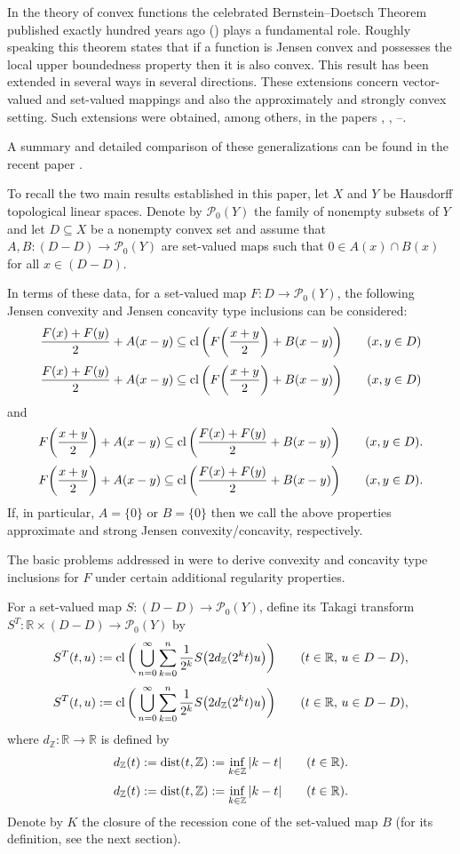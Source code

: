 \documentclass[12pt,reqno]{amsart}
\newcommand{\R}{\mathbb{R}}
\newcommand{\Z}{\mathbb{Z}}
\renewcommand{\P}{\mathscr{P}}
\newcommand{\dist}{\mathop{\hbox{\rm dist}}\nolimits}
\newcommand{\cl}{\mathop{\hbox{\rm cl}}\nolimits}
\theoremstyle{definition}
\def\Eq#1#2{\ifthenelse{\equal{#1}{*}}
  {\begin{equation*}\begin{aligned}[]#2\end{aligned}\end{equation*}}
  {\begin{equation}\begin{aligned}[]\label{E#1}#2\end{aligned}\end{equation}}}
\begin{document}
In the theory of convex functions the celebrated Bernstein--Doetsch Theorem published exactly hundred years ago 
(\cite{BerDoe15}) plays a fundamental role. Roughly speaking this theorem states that if a function is Jensen convex 
and possesses the local upper boundedness property then it is also convex. This result has been extended in several 
ways in several directions. These extensions concern vector-valued and set-valued mappings and also the approximately 
and strongly convex setting. Such extensions were obtained, among others, in the papers \cite{AveCar90},
\cite{AzoGimNikSan11}, \cite{CarNikPap93}--\cite{Tru84}. 
\nocite{GonNikPalRoa14,Haz05a,Haz07b,HazPal04,HazPal05,HazPal09,Lac99,LeiMerNikSan13,MakPal10b,MakPal12b,%
MakPal12c,MakPal13b,MurTabTab12,NgNik93,Nik86,Nik87a,Nik87c,Nik89,Pap90,TabTab09a,TabTab09b,TabTabZol10a,%
TabTabZol10b,Tru84}

A summary and detailed comparison of these generalizations can be found in the recent paper \cite{GonNikPalRoa14}.

To recall the two main results established in this paper, let $X$ and $Y$ be Hausdorff topological linear spaces. 
Denote by $\P_0(Y)$ the family of nonempty subsets of $Y$ and let $D\subseteq X$ be a nonempty convex set and assume 
that $A,B:(D-D)\to\P_0(Y)$ are set-valued maps such that $0\in A(x)\cap B(x)$ for all $x\in (D-D)$. 

In terms of these data, for a set-valued 
map $F:D\to\P_0(Y)$, the following Jensen convexity and Jensen concavity type inclusions can be considered:
\Eq{JCV0}{
\dfrac{F(x) + F(y)}{2} + A(x-y) \subseteq \cl\bigg(F\bigg(\dfrac{x+y}{2}\bigg) + B(x-y)\bigg) 
   \qquad (x,y\in D)
}
and
\Eq{JCC0}{
F\bigg(\dfrac{x+y}{2}\bigg) + A(x-y) \subseteq \cl\bigg(\dfrac{F(x) + F(y)}{2} + B(x-y)\bigg) \qquad (x,y\in D).
}
If, in particular, $A=\{0\}$ or $B=\{0\}$ then we call the above properties approximate and strong Jensen 
convexity/concavity, respectively.

The basic problems addressed in \cite{GonNikPalRoa14} were to derive convexity and concavity type inclusions for $F$ 
under certain additional regularity properties. 

For a set-valued map $S:(D-D)\to\P_0(Y)$, define its Takagi transform $S^T:\R\times (D-D)\to\P_0(Y)$ by
\Eq{Tak0}{
  S^T(t,u):=\cl\bigg(\bigcup_{n=0}^{\infty} \sum_{k=0}^{n} 
                 \frac{1}{2^k}S\big(2d_{\Z}(2^kt)u\big)\bigg)\qquad(t\in\R,\,u\in D-D),
}
where $d_{\Z}:\R\to\R$ is defined by
\Eq{dz}{
  d_{\Z}(t):=\dist(t,\Z):=\inf_{k\in\Z}|k-t| \qquad(t\in\R).
}
Denote by $K$ the closure of the recession cone of the set-valued map $B$ (for its definition, see the next section).
\end{document}
